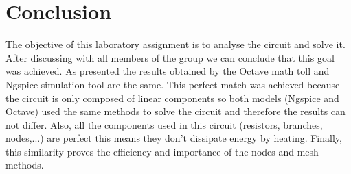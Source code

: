 \newpage
\section{Conclusion}
\label{sec:conclusion}


The objective of this laboratory assignment is to analyse the circuit and solve it. After discussing with all members of the group we can conclude that this goal was achieved.
As presented the results obtained by the Octave math toll and Ngspice simulation tool are the same. This perfect match was achieved because the circuit is only composed of linear components so both models (Ngspice and Octave) used the same methods to solve the circuit and therefore the results can not differ.
Also, all the components used in this circuit (resistors, branches, nodes,...) are perfect this means they don't dissipate energy by heating.
Finally, this similarity proves the efficiency and importance of the nodes and mesh methods.


